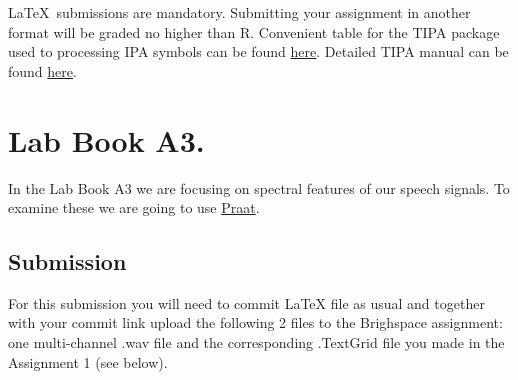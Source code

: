 \documentclass{../labbook}
\begin{document}
\begin{mdframed}[backgroundcolor=blue!20]
\LaTeX ~submissions are mandatory. Submitting your assignment in another format will be graded no higher than R. Convenient table for the TIPA package used to processing IPA symbols can be found \href{https://jon.dehdari.org/tutorials/tipachart_mod.pdf}{here}. Detailed TIPA manual can be found \href{http://www.l.u-tokyo.ac.jp/~fkr/tipa/tipaman.pdf}{here}.
\end{mdframed}

\tableofcontents %

\section{Lab Book A3.}
In the Lab Book A3 we are focusing on spectral features of our speech signals. To examine these we are going to use \href{https://www.fon.hum.uva.nl/praat/}{Praat}. 

\subsection{Submission}
For this submission you will need to commit LaTeX file as usual and together with your commit link upload the following 2 files to the  Brighspace assignment: one multi-channel .wav file and the corresponding .TextGrid file you made in the Assignment 1 (see below).
\end{document}
